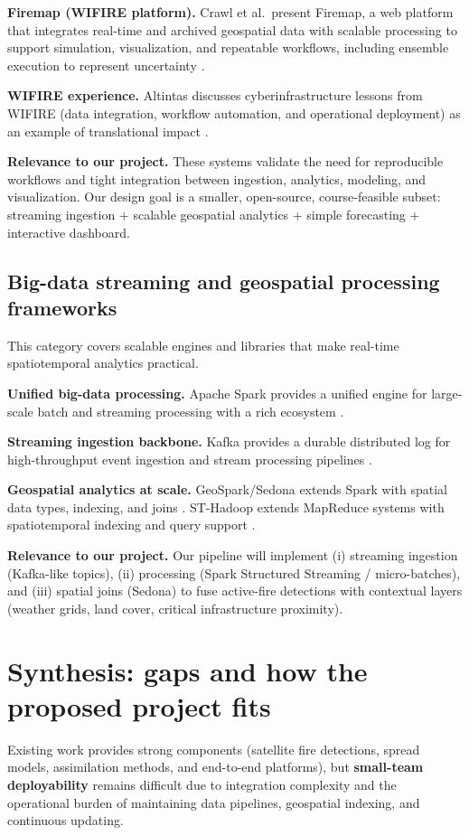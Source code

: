 \documentclass[acmsmall,screen,nonacm]{acmart}
\begin{document}
\textbf{Firemap (WIFIRE platform).} Crawl et al.\ present Firemap, a web platform that integrates real-time and
archived geospatial data with scalable processing to support simulation, visualization, and repeatable workflows,
including ensemble execution to represent uncertainty \cite{crawl2017firemap}.

\textbf{WIFIRE experience.} Altintas discusses cyberinfrastructure lessons from WIFIRE (data integration, workflow
automation, and operational deployment) as an example of translational impact \cite{altintas2021wifire}.

\textbf{Relevance to our project.} These systems validate the need for reproducible workflows and tight integration
between ingestion, analytics, modeling, and visualization. Our design goal is a smaller, open-source, course-feasible
subset: streaming ingestion + scalable geospatial analytics + simple forecasting + interactive dashboard.

\subsection{Big-data streaming and geospatial processing frameworks}
This category covers scalable engines and libraries that make real-time spatiotemporal analytics practical.

\textbf{Unified big-data processing.} Apache Spark provides a unified engine for large-scale batch and streaming
processing with a rich ecosystem \cite{zaharia2016spark}.

\textbf{Streaming ingestion backbone.} Kafka provides a durable distributed log for high-throughput event ingestion
and stream processing pipelines \cite{kreps2011kafka}.

\textbf{Geospatial analytics at scale.} GeoSpark/Sedona extends Spark with spatial data types, indexing, and joins
\cite{yu2019geospark}. ST-Hadoop extends MapReduce systems with spatiotemporal indexing and query support
\cite{alarabi2018sthadoop}.

\textbf{Relevance to our project.} Our pipeline will implement (i) streaming ingestion (Kafka-like topics),
(ii) processing (Spark Structured Streaming / micro-batches), and (iii) spatial joins (Sedona) to fuse active-fire
detections with contextual layers (weather grids, land cover, critical infrastructure proximity).

\section{Synthesis: gaps and how the proposed project fits}
Existing work provides strong components (satellite fire detections, spread models, assimilation methods, and
end-to-end platforms), but \textbf{small-team deployability} remains difficult due to integration complexity and the
operational burden of maintaining data pipelines, geospatial indexing, and continuous updating.
\end{document}
